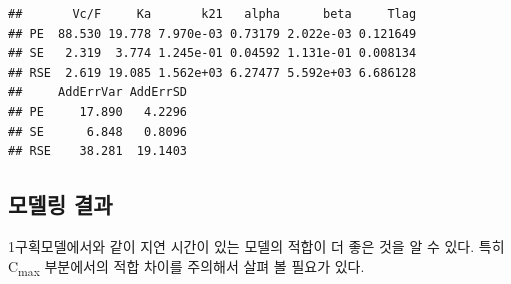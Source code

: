 \documentclass[
  11pt,
  krantz2, a4paper, twoside]{krantz}
\newenvironment{Shaded}{\begin{snugshade}}{\end{snugshade}}
\newcommand{\AttributeTok}[1]{\textcolor[rgb]{0.77,0.63,0.00}{#1}}
\newcommand{\DecValTok}[1]{\textcolor[rgb]{0.00,0.00,0.81}{#1}}
\newcommand{\FunctionTok}[1]{\textcolor[rgb]{0.00,0.00,0.00}{#1}}
\newcommand{\NormalTok}[1]{#1}
\newcommand{\OtherTok}[1]{\textcolor[rgb]{0.56,0.35,0.01}{#1}}
\newcommand{\SpecialCharTok}[1]{\textcolor[rgb]{0.00,0.00,0.00}{#1}}
\newcommand{\StringTok}[1]{\textcolor[rgb]{0.31,0.60,0.02}{#1}}
\theoremstyle{definition}
\theoremstyle{definition}
\theoremstyle{definition}
\theoremstyle{definition}
\theoremstyle{remark}
\begin{document}
\begin{verbatim}
##       Vc/F     Ka       k21   alpha      beta     Tlag
## PE  88.530 19.778 7.970e-03 0.73179 2.022e-03 0.121649
## SE   2.319  3.774 1.245e-01 0.04592 1.131e-01 0.008134
## RSE  2.619 19.085 1.562e+03 6.27477 5.592e+03 6.686128
##     AddErrVar AddErrSD
## PE     17.890   4.2296
## SE      6.848   0.8096
## RSE    38.281  19.1403
\end{verbatim}

\hypertarget{uxbaa8uxb378uxb9c1-uxacb0uxacfc-2}{%
\subsection{모델링 결과}\label{uxbaa8uxb378uxb9c1-uxacb0uxacfc-2}}

1구획모델에서와 같이 지연 시간이 있는 모델의 적합이 더 좋은 것을 알 수 있다. 특히 C\textsubscript{max} 부분에서의 적합 차이를 주의해서 살펴 볼 필요가 있다.

\begin{Shaded}
\end{Shaded}
\end{document}
